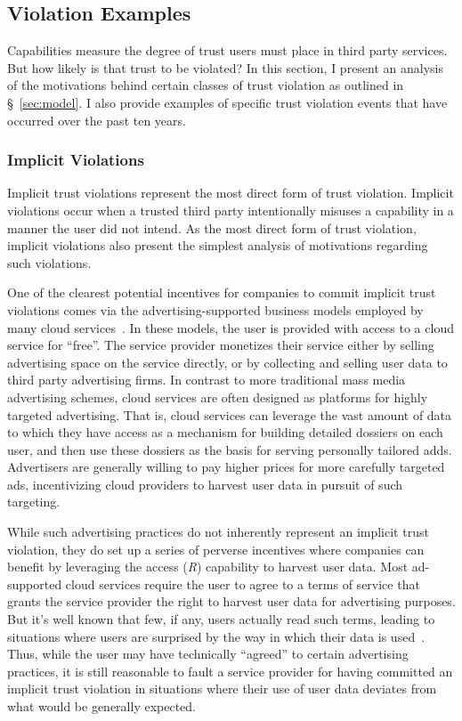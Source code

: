 \subsection{Violation Examples}
\label{sec:analysis:violations}

Capabilities measure the degree of trust users must place in third
party services. But how likely is that trust to be violated? In this
section, I present an analysis of the motivations behind certain
classes of trust violation as outlined in \S~\ref{sec:model}. I also
provide examples of specific trust violation events that have occurred
over the past ten years.

\subsubsection{Implicit Violations}

Implicit trust violations represent the most direct form of trust
violation. Implicit violations occur when a trusted third party
intentionally misuses a capability in a manner the user did not
intend. As the most direct form of trust violation, implicit
violations also present the simplest analysis of motivations regarding
such violations.

One of the clearest potential incentives for companies to commit
implicit trust violations comes via the advertising-supported business
models employed by many cloud services~\cite{evans2009}. In these
models, the user is provided with access to a cloud service for
``free''. The service provider monetizes their service either by
selling advertising space on the service directly, or by collecting
and selling user data to third party advertising firms. In contrast to
more traditional mass media advertising schemes, cloud services are
often designed as platforms for highly targeted advertising. That is,
cloud services can leverage the vast amount of data to which they have
access as a mechanism for building detailed dossiers on each user, and
then use these dossiers as the basis for serving personally tailored
adds. Advertisers are generally willing to pay higher prices for more
carefully targeted ads, incentivizing cloud providers to harvest user
data in pursuit of such targeting.

While such advertising practices do not inherently represent an
implicit trust violation, they do set up a series of perverse
incentives where companies can benefit by leveraging the access
(\emph{R}) capability to harvest user data. Most ad-supported cloud
services require the user to agree to a terms of service that grants
the service provider the right to harvest user data for advertising
purposes. But it's well known that few, if any, users actually read
such terms, leading to situations where users are surprised by the way
in which their data is used~\cite{ hern2015, mcdonald2010}. Thus,
while the user may have technically ``agreed'' to certain advertising
practices, it is still reasonable to fault a service provider for
having committed an implicit trust violation in situations where their
use of user data deviates from what would be generally expected.

